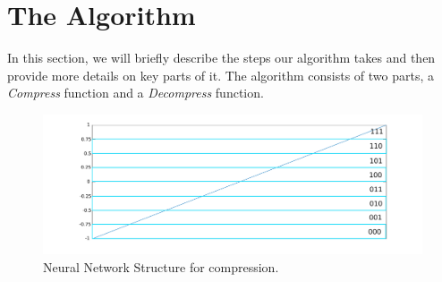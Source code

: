 \section{The Algorithm}
\label{sec:algorithm}

In this section, we will briefly describe the steps our algorithm takes and then provide more details on key parts of it. The algorithm consists of two parts, a \emph{Compress} function and a \emph{Decompress} function. 

\begin{figure}[tbh]
  \centering
  \includegraphics[width=\columnwidth]{images/bqQuantizer}
  \caption{Neural Network Structure for compression.}
  \label{fig:bpQuantizer}
\end{figure}

